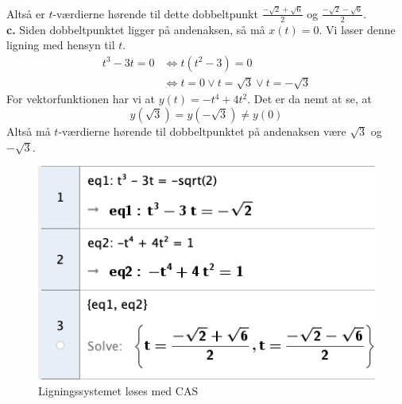 \documentclass{article}
\begin{document}
Altså er $t$-værdierne hørende til dette dobbeltpunkt $\frac{-\sqrt{2} + \sqrt{6}}{2}$ og $ \frac{-\sqrt{2} - \sqrt{6}}{2}$. \\[1ex]
\textbf{c.}
Siden dobbeltpunktet ligger på andenaksen, så må $x(t)=0$.
Vi løser denne ligning med hensyn til $t$.
\begin{equation*}
\begin{split}
  t^3-3t=0 &\iff t(t^2-3)=0\\ 
  &\iff t=0 \lor t=\sqrt{3} \lor t=-\sqrt{3} 
\end{split}
\end{equation*}
For vektorfunktionen har vi at $y(t)=-t^4+4t^2$.
Det er da nemt at se, at 
\[
y(\sqrt{3} )=y(-\sqrt{3} )\neq y(0)
\] 
Altså må $t$-værdierne hørende til dobbeltpunktet på andenaksen være $\sqrt{3} $ og $-\sqrt{3} $.
\begin{figure}[H]
\begin{center}
  \includegraphics[width=\textwidth]{CAS.png}
\end{center}
\caption{Ligningssystemet løses med CAS}
\label{fig:CAS}
\end{figure}
\end{document}
